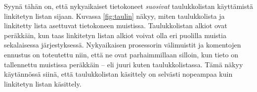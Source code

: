 Syynä tähän on, että nykyaikaiset tietokoneet
\emph{suosivat} taulukkolistan käyttämistä linkitetyn listan sijaan.
Kuvassa \ref{fig:taulin} näkyy, miten taulukkolista ja linkitetty lista
asettuvat tietokoneen muistissa.
Taulukkolistan alkiot ovat peräkkäin, kun taas linkitetyn
listan alkiot voivat olla eri puolilla muistia sekalaisessa
järjestyksessä.
Nykyaikaisen prosessorin välimuistit ja komentojen ennustus
on toteutettu niin, että ne ovat parhaimmillaan silloin,
kun tieto on tallennettu muistissa peräkkäin -- eli juuri kuten
taulukkolistassa.
Tämä näkyy käytännössä siinä, että taulukkolistan käsittely on selvästi
nopeampaa kuin linkitetyn listan käsittely.